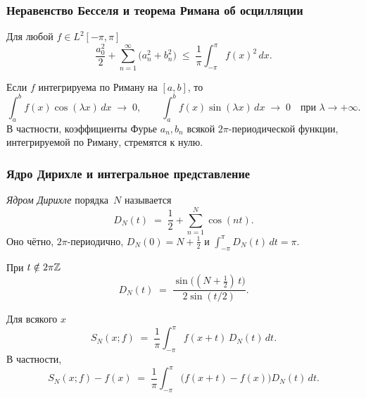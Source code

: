 \subsubsection*{Неравенство Бесселя и теорема Римана об осцилляции}

\begin{theorem}
\label{thm:bessel}
Для любой $f \in L^2[-\pi, \pi]$
\[
  \frac{a_0^2}{2} + \sum_{n=1}^{\infty} \bigl(a_n^2 + b_n^2\bigr)
  \;\le\; \frac{1}{\pi} \int_{-\pi}^{\pi} f(x)^2\, dx.
\]
\end{theorem}

\begin{theorem}
\label{thm:riemann-lebesgue}
Если $f$ интегрируема по Риману на $[a, b]$, то
\[
  \int_{a}^{b} f(x) \cos(\lambda x)\, dx \;\to\; 0,
  \qquad
  \int_{a}^{b} f(x) \sin(\lambda x)\, dx \;\to\; 0
  \quad \text{при } \lambda \to +\infty.
\]
В частности, коэффициенты Фурье $a_n, b_n$ всякой
$2\pi$-периодической функции, интегрируемой по Риману, стремятся к
нулю.
\end{theorem}

\subsubsection*{Ядро Дирихле и интегральное представление}

\begin{definition}
\label{def:dirichlet-kernel}
\emph{Ядром Дирихле} порядка~$N$ называется
\[
  D_N(t) \;=\; \frac{1}{2} + \sum_{n=1}^{N} \cos(nt).
\]
Оно чётно, $2\pi$-периодично, $D_N(0) = N + \tfrac12$ и
$\int_{-\pi}^{\pi} D_N(t)\, dt = \pi$.
\end{definition}

\begin{lemma}
\label{lem:dirichlet-closed}
При $t \notin 2\pi\mathbb{Z}$
\[
  D_N(t) \;=\; \frac{\sin\bigl((N + \tfrac12)\, t\bigr)}{2 \sin(t/2)}.
\]
\end{lemma}

\begin{theorem}
\label{thm:integral-rep}
Для всякого $x$
\[
  S_N(x; f) \;=\; \frac{1}{\pi} \int_{-\pi}^{\pi} f(x + t)\, D_N(t)\, dt.
\]
В частности,
\[
  S_N(x; f) - f(x) \;=\; \frac{1}{\pi} \int_{-\pi}^{\pi} \bigl(f(x + t) - f(x)\bigr) D_N(t)\, dt.
\]
\end{theorem}

